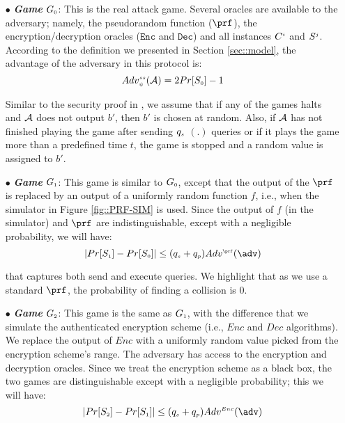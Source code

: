 \begin{itemize}
%
\item[$\bullet$] \textit{\textbf{Game}} $G_{\scriptscriptstyle  0}$: This is the real attack game. Several oracles are  available to the adversary; namely, the pseudorandom function ($\prf$),  the encryption/decryption oracles ($\mathtt{Enc}$ and $\mathtt{Dec}$) and all instances $C^{\scriptscriptstyle  i}$ and $S^{\scriptscriptstyle  j}$.
%
According to the definition we presented in Section \ref{sec::model}, the advantage of the adversary in this protocol is: 
%
\begin{equation}\label{eq::adv-ake-}
Adv_{\scriptscriptstyle  \psi}^{\scriptscriptstyle  ss}(\mathcal{A})=2Pr[S_{\scriptscriptstyle  0}]-1
\end{equation}

Similar to the security proof in \cite{BressonCP03}, we assume that if any of the games halts and $\mathcal{A}$ does not output $b'$, then $b'$  is chosen at random. Also, if $\mathcal{A}$ has not finished playing the game after sending $q_{\scriptscriptstyle  s}$  \send$(.)$ queries or if it plays the game more than a predefined time $t$, the game is stopped and a random value is assigned to $b'$. 
%



\item[$\bullet$] \textit{\textbf{Game}}  $G_{\scriptscriptstyle  1}$: This game is similar to  $G_{\scriptscriptstyle  0}$, except that the output of the $\prf$ is replaced by an output of  a uniformly random function $f$, i.e., when the simulator in Figure \ref{fig::PRF-SIM} is used. Since the output of $f$ (in the simulator) and $\prf$ are indistinguishable, except with a negligible probability, we will have: 
%
\begin{equation}\label{eq::game_1}
|Pr[S_{\sss  1}]-Pr[S_{\sss  0}]|\leq (q_{\sss s}+q_{\sss p})Adv^{\sss\prf}(\adv)
\end{equation}

that captures both send and execute queries. We highlight that as we use a standard $\prf$, the probability of finding a collision is $0$. 



\item[$\bullet$] \textit{\textbf{Game}}  $G_{\scriptscriptstyle  2}$: This game is the same as $G_{\scriptscriptstyle  1}$, with the difference that we simulate the authenticated encryption scheme (i.e., $Enc$ and $Dec$ algorithms). We replace the output of $Enc$ with a uniformly random value picked from the encryption scheme's range. The adversary has access to the encryption and decryption oracles. Since we treat the encryption scheme as a black box, the two games are distinguishable except with a negligible probability; this we will have: 
\begin{equation}\label{eq::game_2}
|Pr[S_{\sss  2}]-Pr[S_{\sss  1}]| \leq (q_{\sss s}+q_{\sss p}) Adv^{\sss Enc}(\adv)
\end{equation}


\end{itemize}
